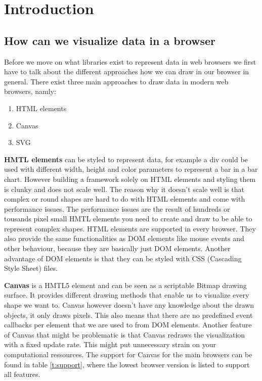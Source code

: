 \documentclass{bioinfo}
\begin{document}
\section{Introduction}
\subsection{How can we visualize data in a browser}
Before we move on what libraries exist to represent data in web browsers we first have to talk about the different approaches how we can draw in our browser in general.
\newline
There exist three main approaches to draw data in modern web browsers, namly:
\begin{enumerate}
\item HTML elements
\item Canvas
\item SVG
\end{enumerate}

\textbf{HMTL elements} can be styled to represent data, for example a div could be used with different width, height and color parameters to represent a bar in a bar chart.
However building a framework solely on HTML elements and styling them is clunky and does not scale well.
The reason why it doesn't scale well is that complex or round shapes are hard to do with HTML elements and come with performance issues. The performance issues are the result of hundreds or tousands pixel small HMTL elements you need to create and draw to be able to represent complex shapes.
HTML elements are supported in every browser.
They also provide the same functionalities as DOM elements like mouse events and other behaviour, because they are basically just DOM elements.
Another advantage of DOM elements is that they can be styled with CSS (Cascading Style Sheet) files.

\hfill \break
\textbf{Canvas} is a HMTL5 element and can be seen as a scriptable Bitmap drawing surface.
It provides different drawing methods that enable us to visualize every shape we want to.
Canvas however doesn't have any knowledge about the drawn objects, it only draws pixels.
This also means that there are no predefined event callbacks per element that we are used to from DOM elements.
Another feature of Canvas that might be problematic is that Canvas redraws the visualization with a fixed update rate. This might put unnecessary strain on your computational ressources.
The support for Canvas for the main browsers can be found in table \ref{t:support}, where the lowest browser version is listed to support all features.
\end{document}
